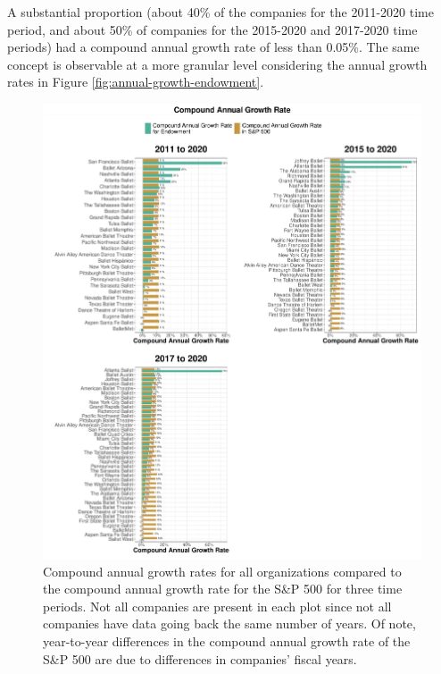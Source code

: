 \documentclass[Dance Data
Project,article,submit,moreauthors,pdftex]{mdpi}
\begin{document}
A substantial proportion (about 40\% of the companies for the 2011-2020
time period, and about 50\% of companies for the 2015-2020 and 2017-2020
time periods) had a compound annual growth rate of less than 0.05\%. The
same concept is observable at a more granular level considering the
annual growth rates in Figure \ref{fig:annual-growth-endowment}.

\begin{figure}[H]
\includegraphics[width=0.9\linewidth,]{../images/compound-growth} \caption{\label{fig:compound-growth}Compound annual growth rates for all organizations compared to the compound annual growth rate for the S\&P 500 for three time periods. Not all companies are present in each plot since not all companies have data going back the same number of years. Of note, year-to-year differences in the compound annual growth rate of the S\&P 500 are due to differences in companies' fiscal years.}\label{fig:unnamed-chunk-12}
\end{figure}
\end{document}
